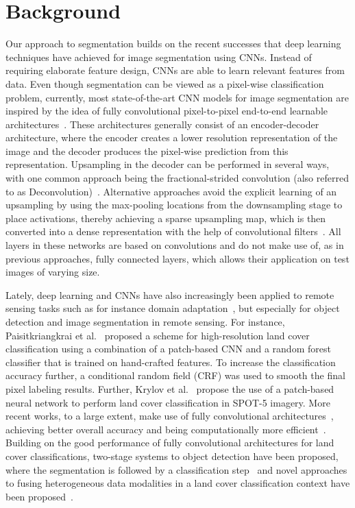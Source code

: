 \documentclass[journal]{IEEEtran}
\begin{document}
\section{Background}
\label{sec:related}
Our approach to segmentation builds on the recent successes that deep learning techniques have achieved for image segmentation using CNNs. Instead of requiring elaborate feature design, CNNs are able to learn relevant features from data. Even though segmentation can be viewed as a pixel-wise classification problem, currently, most state-of-the-art CNN models for image segmentation are inspired by the idea of fully convolutional pixel-to-pixel end-to-end learnable architectures~\cite{long2015fully}. These architectures generally consist of an encoder-decoder architecture, where the encoder creates a lower resolution representation of the image and the decoder produces the pixel-wise prediction from this representation. Upsampling in the decoder can be performed in several ways, with one common approach being the fractional-strided convolution (also referred to as Deconvolution)~\cite{long2015fully}. Alternative approaches avoid the explicit learning of an upsampling by using the max-pooling locations from the downsampling stage to place activations, thereby achieving a sparse upsampling map, which is then converted into a dense representation with the help of convolutional filters~\cite{badrinarayanan2015segnet}. All layers in these networks are based on convolutions and do not make use of, as in previous approaches, fully connected layers, which allows their application on test images of varying size.

Lately, deep learning and CNNs have also increasingly been applied to remote sensing tasks such as for instance domain adaptation~\cite{riz2016domain}, but especially for object detection and image segmentation in remote sensing. For instance, Paisitkriangkrai et al.~\cite{paisitkriangkrai2015effective} proposed a scheme for high-resolution land cover classification using a combination of a patch-based CNN and a random forest classifier that is trained on hand-crafted features. To increase the classification accuracy further, a conditional random field (CRF) was used to smooth the final pixel labeling results. Further, Krylov et al.~\cite{krylov2016large} propose the use of a patch-based neural network to perform land cover classification in SPOT-5 imagery. More recent works, to a large extent, make use of fully convolutional architectures~\cite{kampffmeyer2016semantic,maggiori2016fully,volpi2017dense}, achieving better overall accuracy and being computationally more efficient~\cite{kampffmeyer2016semantic,volpi2017dense}. Building on the good performance of fully convolutional architectures for land cover classifications, two-stage systems to object detection have been proposed, where the segmentation is followed by a classification step~\cite{audebert2017segment} and novel approaches to fusing heterogeneous data modalities in a land cover classification context have been proposed~\cite{audebert2017fusion}.
\end{document}
